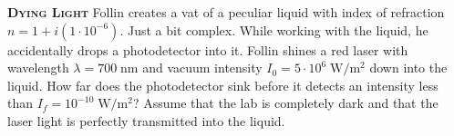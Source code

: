 \begin{problem}{\textbf{\textsc{Dying Light}}} Follin creates a vat of a peculiar liquid with index of refraction $n = 1 + i(1\cdot 10^{-6}).$ Just a bit complex. While working with the liquid, he accidentally drops a photodetector into it. Follin shines a red laser with wavelength $\lambda=700\;\text{nm}$ and vacuum intensity $I_0 = 5\cdot 10^{6}\;\mathrm{W/m^2}$ down into the liquid. How far does the photodetector sink before it detects an intensity less than $I_f = 10^{-10}\;\mathrm{W/m^2}$? Assume that the lab is completely dark and that the laser light is perfectly transmitted into the liquid.

\end{problem}